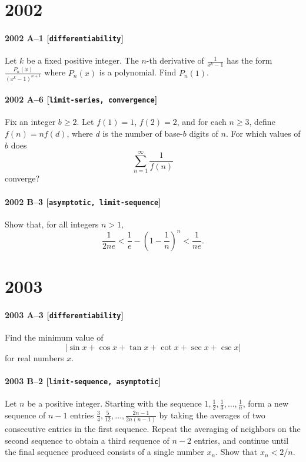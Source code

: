 \documentclass[11pt]{article}
\begin{document}
\section*{2002}

\paragraph{2002 A--1 \textnormal{[\texttt{differentiability}]}}
Let $k$ be a fixed positive integer. The $n$-th derivative of
$\frac{1}{x^k - 1}$ has the form $\frac{P_n(x)}{(x^k - 1)^{n+1}}$
where $P_n(x)$ is a polynomial. Find $P_n(1)$.

\paragraph{2002 A--6 \textnormal{[\texttt{limit-series, convergence}]}}
Fix an integer $b \geq 2$. Let $f(1) = 1$, $f(2) = 2$, and for each
$n \geq 3$, define $f(n) = n f(d)$, where $d$ is the number of
base-$b$ digits of $n$. For which values of $b$ does
\[
\sum_{n=1}^\infty \frac{1}{f(n)}
\]
converge?

\paragraph{2002 B--3 \textnormal{[\texttt{asymptotic, limit-sequence}]}}
Show that, for all integers $n > 1$,
\[
\frac{1}{2ne} < \frac{1}{e} - \left( 1 - \frac{1}{n} \right)^n
< \frac{1}{ne}.
\]

\section*{2003}

\paragraph{2003 A--3 \textnormal{[\texttt{differentiability}]}}
Find the minimum value of
\[
  | \sin x + \cos x + \tan x + \cot x + \sec x + \csc x |
\]
for real numbers $x$.

\paragraph{2003 B--2 \textnormal{[\texttt{limit-sequence, asymptotic}]}}
Let $n$ be a positive integer. Starting with the sequence
$1, \frac{1}{2}, \frac{1}{3}, \dots, \frac{1}{n}$,
form a new sequence of $n-1$ entries
$\frac{3}{4}, \frac{5}{12}, \dots, \frac{2n-1}{2n(n-1)}$
by taking the averages of
two consecutive entries in the first sequence. Repeat the
averaging of neighbors on the second sequence to obtain a third
sequence of $n-2$ entries, and continue until the final sequence produced
consists of a single number $x_n$. Show that $x_n < 2/n$.
\end{document}

